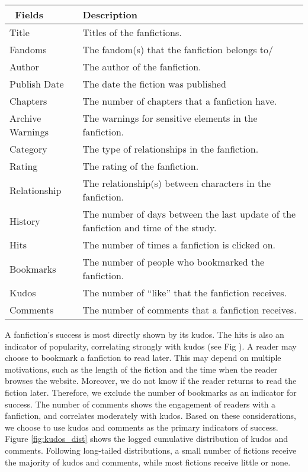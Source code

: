\documentclass[a4paper]{article}
\begin{document}
\begin{table}
\centering
\begin{tabular}[width=0.8\textwidth]{p{3cm}p{10cm}}
\toprule
\ Fields & Description \\ 
   \hline			
Title & Titles of the fanfictions.  \\
Fandoms & The fandom(s) that the fanfiction belongs to/ \\
Author & The author of the fanfiction.  \\
Publish Date & The date the fiction was published \\
Chapters & The number of chapters that a fanfiction have. \\
Archive Warnings & The warnings for sensitive elements in the fanfiction. \\
Category & The type of relationships in the fanfiction. \\
Rating & The rating of the fanfiction. \\
Relationship & The relationship(s) between characters in the fanfiction. \\
History & The number of days between the last update of the fanfiction and time of the study. \\
\hline
Hits & The number of times a fanfiction is clicked on. \\
Bookmarks & The number of people who bookmarked the fanfiction.\\
Kudos & The number of ``like'' that the fanfiction receives. \\
Comments & The number of comments that a fanfiction receives.\\
\bottomrule
\end{tabular}
\label{tab:metadata}
\end{table}%

A fanfiction's success is most directly shown by its kudos. The hits is also an indicator of popularity, correlating strongly with kudos (see Fig ). A reader may choose to bookmark a fanfiction to read later. This may depend on multiple motivations, such as the length of the fiction and the time when the reader browses the website. Moreover, we do not know if the reader returns to read the fiction later. Therefore, we exclude the number of bookmarks as an indicator for success. The number of comments shows the engagement of readers with a fanfiction, and correlates moderately with kudos. Based on these considerations, we choose to use kudos and comments as the primary indicators of success. Figure \ref{fig:kudos_dist} shows the logged cumulative distribution of kudos and comments. Following long-tailed distributions, a small number of fictions receive the majority of kudos and comments, while most fictions receive little or none. 
\end{document}
